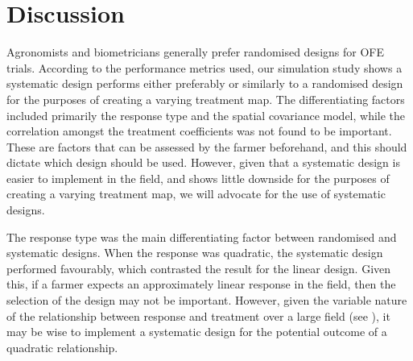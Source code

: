 \documentclass[a4paper]{article} 	%
\begin{document}
\section{Discussion}\label{Sec:Dis}

Agronomists and biometricians generally prefer randomised designs for OFE trials. According to the performance metrics used, our simulation study shows a systematic design performs either preferably or similarly to a randomised design for the purposes of creating a varying treatment map. The differentiating factors included primarily the response type and the spatial covariance model, while the correlation amongst the treatment coefficients was not found to be important. These are factors that can be assessed by the farmer beforehand, and this should dictate which design should be used. However, given that a systematic design is easier to implement in the field, and shows little downside for the purposes of creating a varying treatment map, we will advocate for the use of systematic designs. 

The response type was the main differentiating factor between randomised and systematic designs. When the response was quadratic, the systematic design performed favourably, which contrasted the result for the linear design. Given this, if a farmer expects an approximately linear response in the field, then the selection of the design may not be important. However, given the variable nature of the relationship between response and treatment over a large field (see \textcite{Rakshit2020Novel}), it may be wise to implement a systematic design for the potential outcome of a quadratic relationship. 
\end{document}
